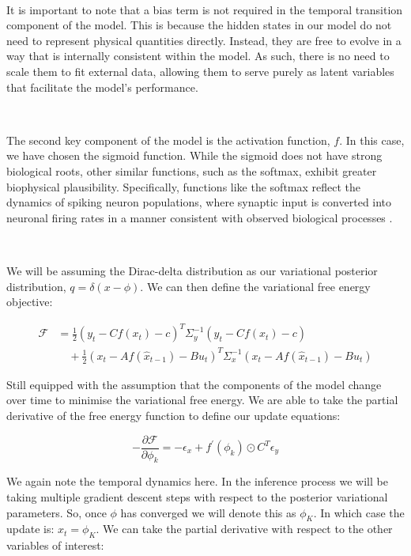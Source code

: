\documentclass{article}
\begin{document}
\

It is important to note that a bias term is not required in the temporal transition component of the model. This is because the hidden states in our model do not need to represent physical quantities directly. Instead, they are free to evolve in a way that is internally consistent within the model. As such, there is no need to scale them to fit external data, allowing them to serve purely as latent variables that facilitate the model's performance.

\

The second key component of the model is the activation function, $f$. In this case, we have chosen the sigmoid function. While the sigmoid does not have strong biological roots, other similar functions, such as the softmax, exhibit greater biophysical plausibility. Specifically, functions like the softmax reflect the dynamics of spiking neuron populations, where synaptic input is converted into neuronal firing rates in a manner consistent with observed biological processes \citep{deco2008brain}.

\

We will be assuming the Dirac-delta distribution as our variational posterior distribution, $q= \delta(x - \phi)$. We can then define the variational free energy objective:

\begin{equation}
    \begin{aligned}
        \mathcal{F} &= \frac{1}{2} \left(y_t - C f\left(x_t\right) - c\right)^T \Sigma_y^{-1} \left(y_t - C f\left(x_t\right) - c\right) \\
        &\quad + \frac{1}{2} \left(x_t - A f\left(\hat{x}_{t-1}\right) - B u_t\right)^T \Sigma_x^{-1} \left(x_t - A f\left(\hat{x}_{t-1}\right) - B u_t\right)
    \end{aligned}
\end{equation}

Still equipped with the assumption that the components of the model change over time to minimise the variational free energy. We are able to take the partial derivative of the free energy function to define our update equations:

\begin{equation}\label{eq:tpc_neural}
	-\frac{\partial \mathcal{F}}{\partial\phi_k}=-\epsilon_x+f^{\prime}\left(\phi_k\right) \odot C^T \epsilon_y
\end{equation}

We again note the temporal dynamics here. In the inference process we will be taking multiple gradient descent steps with respect to the posterior variational parameters. So, once $\phi$ has converged we will denote this as $\phi_K$. In which case the update is: $x_t = \phi_K$. We can take the partial derivative with respect to the other variables of interest:
\end{document}
